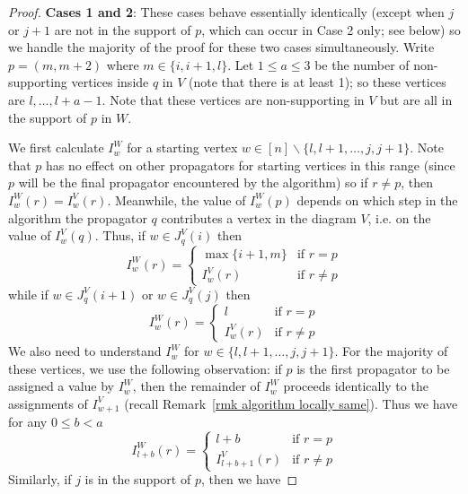 \documentclass[11pt]{article}
\theoremstyle{remark}
\theoremstyle{definition}
\begin{document}
\begin{proof}

\textbf{Cases 1 and 2}: These cases behave essentially identically (except when $j$ or $j+1$ are not in the support of $p$, which can occur in Case 2 only; see below) so we handle the majority of the proof for these two cases simultaneously. Write $p=(m,m+2)$ where $m\in \{i, i+1, l\}$. Let $1\leq a\leq 3$ be the number of non-supporting vertices inside $q$ in $V$ (note that there is at least 1); so these vertices are $l, \ldots, l+a-1$.  Note that these vertices are non-supporting in $V$ but are all in the support of $p$ in $W$. 

We first calculate $I^{W}_w$ for a starting vertex ${w \in [n]\backslash \{l, l+1, \ldots,j,j+1\}}$. Note that $p$ has no effect on other propagators for starting vertices in this range (since $p$ will be the final propagator encountered by the algorithm) so if $r \neq p$, then $I_w^W(r) = I_w^V(r)$. Meanwhile, the value of $I^{W}_w(p)$ depends on which step in the algorithm the propagator $q$ contributes a vertex in the diagram $V$, i.e. on the value of $I^{V}_w(q)$. Thus, if $w\in J_q^{V}(i)$ then 
    \[
    I_w^{W}(r) =  \begin{cases}
        \max\{i+1, m\} & \text{if } r=p \\
        I_{w}^{V}(r) & \text{if } r\neq p
      \end{cases} 
    \]
    while if $w\in J_q^{V}(i+1)$ or $w\in J_q^{V}(j)$ then
    \[
    I_w^{W}(r) =  \begin{cases}
        l & \text{if } r=p \\
        I_{w}^{V}(r) & \text{if } r\neq p
      \end{cases} 
      \]
We also need to understand $I^{W}_w$ for $w \in \{l,l+1,\ldots,j,j+1\}$. For the majority 
of these vertices, we use the following observation: if $p$ is the first propagator to be assigned a value by $I_w^{W}$, then the remainder of $I_w^{W}$ proceeds identically to the assignments of $I^{V}_{w+1}$ (recall Remark~\ref{rmk algorithm locally same}).  Thus we have for any $0\leq b <a$
    \[
    I_{l+b}^{W}(r) = \begin{cases}
      l+b & \text{if } r=p\\
      I_{l+b+1}^{V}(r) & \text{if } r\neq p
    \end{cases}
    \]
Similarly, if $j$ is in the support of $p$, then we have

\end{proof}
\end{document}
